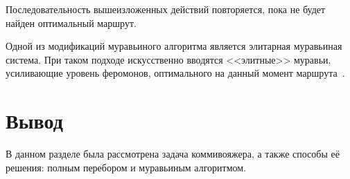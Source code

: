Последовательность вышеизложенных действий повторяется, пока не будет найден оптимальный маршрут.

Одной из модификаций муравьиного алгоритма является элитарная муравьиная система.
При таком подходе искусственно вводятся <<элитные>> муравьи, усиливающие уровень феромонов, оптимального на данный момент маршрута~\cite{elite-ants-alg}.


\section*{Вывод}

В данном разделе была рассмотрена задача коммивояжера, а также способы её решения: полным перебором и муравьиным алгоритмом.